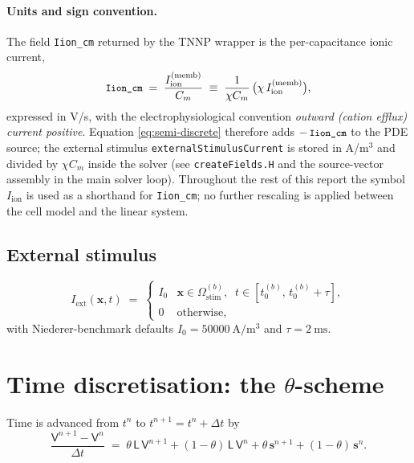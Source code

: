 \documentclass[11pt,a4paper]{article}
\newcommand{\Iion}{I_{\text{ion}}}
\newcommand{\Iext}{I_{\text{ext}}}
\newcommand{\Lop}{\mathsf{L}}
\newcommand{\code}[1]{\texttt{\small #1}}
\begin{document}
\paragraph{Units and sign convention.} The field \code{Iion\_cm}
returned by the TNNP wrapper is the per-capacitance ionic current,
\begin{equation*}
  \code{Iion\_cm}
   \;=\;
   \frac{I_{\text{ion}}^{\text{(memb)}}}{C_{m}}
   \;\equiv\;
   \frac{1}{\chi C_{m}}\,
   \bigl(\chi\, I_{\text{ion}}^{\text{(memb)}}\bigr),
\end{equation*}
expressed in V/s, with the electrophysiological convention
\emph{outward (cation efflux) current positive}. Equation
\eqref{eq:semi-discrete} therefore adds $-\,\code{Iion\_cm}$ to the
PDE source; the external stimulus \code{externalStimulusCurrent} is
stored in A/m$^{3}$ and divided by $\chi C_{m}$ inside the solver
(see \code{createFields.H} and the source-vector assembly in the
main solver loop). Throughout the rest of this report the symbol
$\Iion$ is used as a shorthand for \code{Iion\_cm}; no further
rescaling is applied between the cell model and the linear system.

\subsection{External stimulus}

\begin{equation}
  \Iext(\mathbf{x}, t) \;=\;
  \begin{cases}
    I_{0} & \mathbf{x} \in \Omega_{\text{stim}}^{(b)},
            \;\; t \in [t_{0}^{(b)},\, t_{0}^{(b)} + \tau], \\
    0     & \text{otherwise},
  \end{cases}
\end{equation}
with Niederer-benchmark defaults
$I_{0} = \SI{50000}{\ampere\per\meter\cubed}$ and
$\tau = \SI{2}{\milli\second}$.

\section{Time discretisation: the $\theta$-scheme}

Time is advanced from $t^{n}$ to $t^{n+1} = t^{n} + \Delta t$ by
\begin{equation}
  \frac{\mathsf{V}^{n+1} - \mathsf{V}^{n}}{\Delta t}
   \;=\;
   \theta\, \Lop\, \mathsf{V}^{n+1}
   + (1-\theta)\, \Lop\, \mathsf{V}^{n}
   + \theta\, \mathbf{s}^{n+1}
   + (1-\theta)\, \mathbf{s}^{n}.
\end{equation}
\end{document}
